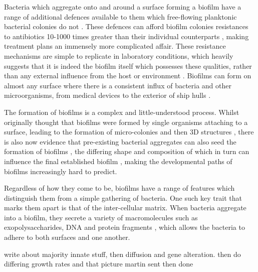 \documentclass[a4paper,12pt]{article}
\begin{document}
Bacteria which aggregate onto and around a surface forming a biofilm have a range of additional defences available to them which free-flowing planktonic bacterial 
colonies do not \cite{bioref:Lewis-biofilm-riddle-2001}.  These defences can afford biofilm colonies resistances to antibiotics 10-1000 times greater than their individual counterparts 
\cite{bioref:Anderson-innate-biofilm-resistances-2008}, making treatment plans an immensely more complicated affair.  These resistance mechanisms are simple to replicate in laboratory 
conditions, which heavily suggests that it is indeed the biofilm itself which possesses these qualities, rather than any external influence from the host or environment 
\cite{bioref:Stewart-biofilm-resis-mechanisms-2002}.  Biofilms can form on almost any surface where there is a consistent influx of bacteria and other microorganisms, from medical 
devices \cite{bioref:Donlan-biofilms-medical-devices-2002} to the exterior of ship hulls \cite{bioref:Chambers-modern-antifoul-coatings-2006}.  

The formation of biofilms is a complex and little-understood process.  Whilst originally thought that biofilms were formed by single organisms attaching to a surface, leading to 
the formation of micro-colonies and then 3D structures \cite{bioref:Monds-biofilm-formation-2009}, there is also now evidence that pre-existing bacterial aggregates can also 
seed the formation of biofilms \cite{bioref:hall-stooley-biofilm-clumps-2005}, the differing shape and composition of which in turn can influence the final established biofilm 
\cite{bioref:Xavier-biofilm-framework-multiD-modelling-2005}, making the developmental paths of biofilms increasingly hard to predict.

Regardless of how they come to be, biofilms have a range of features which distinguish them from a simple gathering of bacteria. One such key trait that marks them apart is that of the 
inter-cellular matrix.  When bacteria aggregate into a biofilm, they secrete a variety of macromolecules such as exopolysaccharides, DNA and protein fragments 
\cite{bioref:Whitechurch-biomatrix-components-2002}, which allows the bacteria to adhere to both surfaces and one another.

write about majority innate stuff, then diffusion and gene alteration. then do differing growth rates and that picture martin sent then done
\end{document}
